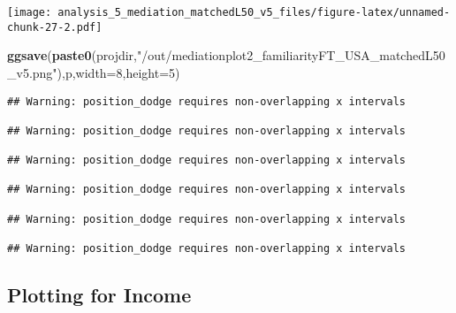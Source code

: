 \documentclass[
]{article}
\newenvironment{Shaded}{\begin{snugshade}}{\end{snugshade}}
\newcommand{\DataTypeTok}[1]{\textcolor[rgb]{0.13,0.29,0.53}{#1}}
\newcommand{\DecValTok}[1]{\textcolor[rgb]{0.00,0.00,0.81}{#1}}
\newcommand{\KeywordTok}[1]{\textcolor[rgb]{0.13,0.29,0.53}{\textbf{#1}}}
\newcommand{\NormalTok}[1]{#1}
\newcommand{\StringTok}[1]{\textcolor[rgb]{0.31,0.60,0.02}{#1}}
\begin{document}
\texttt{[image: analysis\_5\_mediation\_matchedL50\_v5\_files/figure-latex/unnamed-chunk-27-2.pdf]}

\begin{Shaded}
\begin{Highlighting}[]
\KeywordTok{ggsave}\NormalTok{(}\KeywordTok{paste0}\NormalTok{(projdir,}\StringTok{"/out/mediationplot2_familiarityFT_USA_matchedL50_v5.png"}\NormalTok{),p,}\DataTypeTok{width=}\DecValTok{8}\NormalTok{,}\DataTypeTok{height=}\DecValTok{5}\NormalTok{)}
\end{Highlighting}
\end{Shaded}

\begin{verbatim}
## Warning: position_dodge requires non-overlapping x intervals

## Warning: position_dodge requires non-overlapping x intervals

## Warning: position_dodge requires non-overlapping x intervals

## Warning: position_dodge requires non-overlapping x intervals

## Warning: position_dodge requires non-overlapping x intervals

## Warning: position_dodge requires non-overlapping x intervals
\end{verbatim}

\hypertarget{plotting-for-income}{%
\subsection{Plotting for Income}\label{plotting-for-income}}
\end{document}
